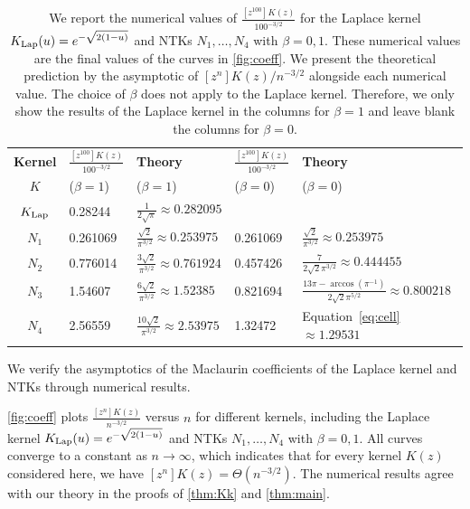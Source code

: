 \documentclass[11pt]{article}
\newcommand{\klap}{K_{\textnormal{Lap}}}
\begin{document}
\begin{table}[htb]
    \centering
    \begin{tabular}{c|l|l|l|l}
    \toprule
        \textbf{Kernel}  & $\frac{[z^{100}]K(z)}{100^{-3/2}}$ & \textbf{Theory} & $\frac{[z^{100}]K(z)}{100^{-3/2}}$ & \textbf{Theory} \\
       $K$ & ($\beta=1$) & ($\beta=1$)  & ($\beta = 0$) & ($\beta=0$)
        \\ \midrule
        $\klap$ & 0.28244 & $\frac{1}{2 \sqrt{\pi }} \approx 0.282095$ & &  \\
        $N_1$ & 0.261069 & $\frac{\sqrt{2}}{\pi ^{3/2}} \approx 0.253975 $ & 0.261069 & $\frac{\sqrt{2}}{\pi ^{3/2}}\approx 0.253975$\\
        $N_2$ & 0.776014 & $\frac{3 \sqrt{2}}{\pi ^{3/2}}\approx 0.761924$ &  0.457426 & $\frac{7}{2 \sqrt{2} \pi ^{3/2}} \approx 0.444455$\\
        $N_3$ & 1.54607 & $\frac{6 \sqrt{2}}{\pi ^{3/2}} \approx 1.52385$ &  0.821694 & $\frac{13 \pi -\arccos\left(\pi^{-1}\right)}{2 \sqrt{2} \pi ^{5/2}} \approx 0.800218$ \\
        $N_4$ & 2.56559 & $\frac{10 \sqrt{2}}{\pi ^{3/2}} \approx 2.53975 $ & 1.32472 & Equation~\eqref{eq:cell} $\approx 1.29531$
        \\
        \bottomrule
    \end{tabular}
    \caption{We report the numerical values of $ \frac{[z^{100}]K(z)}{100^{-3/2}}$ for the Laplace kernel $\klap(u) = e^{-\sqrt{2(1-u)}}$ and NTKs $N_1,\dots,N_4$ with $\beta=0,1$. These numerical values are the final values of the curves in \cref{fig:coeff}.   We present the theoretical prediction by the asymptotic of $[z^n]K(z)/n^{-3/2}$ alongside each numerical value. The choice of $\beta$ does not apply to the Laplace kernel. Therefore, we only show the results of the Laplace kernel in the columns for $\beta=1$ and leave blank the columns for $\beta=0$. }
    \label{tab:limit}
\end{table}

We verify the asymptotics of the Maclaurin coefficients of the Laplace kernel and NTKs through numerical results. 

\cref{fig:coeff} plots $\frac{[z^n]K(z)}{n^{-3/2}}$ versus $n$ for different kernels, including the Laplace kernel $\klap(u) = e^{-\sqrt{2(1-u)}}$ and NTKs $N_1,\dots,N_4$ with $\beta=0,1$. All curves converge to a constant as $n\to \infty$, which indicates that for every kernel $K(z)$ considered here, we have $[z^n]K(z) = \Theta(n^{-3/2})$. The numerical results agree with our theory in the proofs of \cref{thm:Kk} and \cref{thm:main}. 
\end{document}
